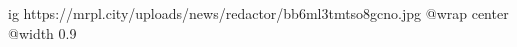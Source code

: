  
 
 
 
 

\ifcmt
  ig https://mrpl.city/uploads/news/redactor/bb6ml3tmtso8gcno.jpg
  @wrap center
  @width 0.9
\fi
